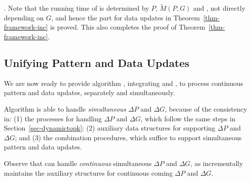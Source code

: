 . Note that the running time of \incd is determined by $P$, $\tilde{M}(P,G)$ and \affballsx, not directly depending on $G$,
and hence the part for data updates in Theorem~\ref{thm-framework-inc} is proved. This also completes the proof of Theorem~\ref{thm-framework-inc}.

\subsection{Unifying Pattern and Data Updates}
\label{subsec-completePG}

We are now ready to provide algorithm \inc, integrating \incp and \incd,  to process continuous pattern and data updates, separately and simultaneously.

Algorithm \inc is able to handle {\em simultaneous} $\Delta P$ and $\Delta G$, because of the consistency in:
(1) the processes for handling $\Delta P$ and $\Delta G$, which follow the same steps in Section~\ref{sec-dynamictopk};
(2) auxiliary data structures for supporting $\Delta P$ and $\Delta G$; and
(3) the combination procedures, which suffice to support simultaneous pattern and data updates.

Observe that \inc can handle {\em continuous} simultaneous $\Delta P$ and $\Delta G$,
as \inc incrementally maintains the auxiliary structures for continuous coming $\Delta P$ and $\Delta G$.
